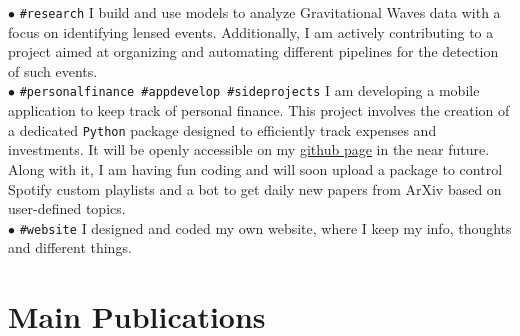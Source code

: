 \documentclass[letterpaper]{twentysecondcv} %
\begin{document}
$\bullet$ \texttt{\#research}  
          {\small %
          I build and use models to analyze Gravitational Waves data with a focus on identifying lensed events. Additionally, I am actively contributing to a project aimed at organizing and automating different pipelines for the detection of such events.}\\ 
$\bullet$ \texttt{\#personalfinance \#appdevelop \#sideprojects}
          {\small I am developing a mobile application to keep track of personal finance.
          This project involves the creation of a dedicated \texttt{Python} package designed to efficiently track expenses and investments. It will be openly accessible on my \href{https://github.com/PaoloCremo}{github page} in the near future. Along with it, I am having fun coding and will soon upload a package to control Spotify custom playlists and a bot to get daily new papers from ArXiv based on user-defined topics.}\\
$\bullet$ \texttt{\#website}   
          {\small I designed and coded my own website, where I keep my info, thoughts and different things.}



% 


\section{Main Publications}
\end{document}
